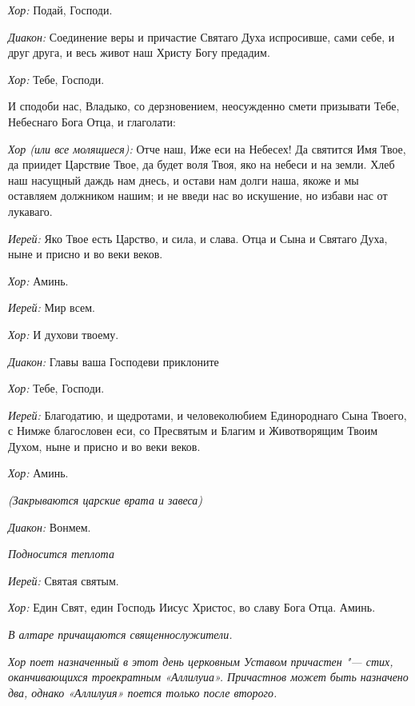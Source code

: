 \begin{mymulticols}
{\itshape Хор:} Подай, Господи.

{\itshape Диакон:} Соединение веры и причастие Святаго Духа испросивше, сами себе, и друг друга, и весь живот наш Христу Богу предадим. 

{\itshape Хор:} Тебе, Господи. 

И сподоби нас, Владыко, со дерзновением, неосужденно смети призывати Тебе, Небеснаго Бога Отца, и глаголати: 


{\itshape Хор (или все молящиеся):} Отче наш, Иже еси на Небесех! Да святится Имя Твое, да приидет Царствие Твое, да будет воля Твоя, яко на небеси и на земли. Хлеб наш насущный даждь нам днесь, и остави нам долги наша, якоже и мы оставляем должником нашим; и не введи нас во искушение, но избави нас от лукаваго. 

{\itshape Иерей:} Яко Твое есть Царство, и сила, и слава. Отца и Сына и Святаго Духа, ныне и присно и во веки веков. 

{\itshape Хор:} Аминь. 

{\itshape Иерей:} Мир всем. 

{\itshape Хор:} И духови твоему.

{\itshape Диакон:} Главы ваша Господеви приклоните

{\itshape Хор:} Тебе, Господи.

{\itshape Иерей:} Благодатию, и щедротами, и человеколюбием Единороднаго Сына Твоего, с Нимже благословен еси, со Пресвятым и Благим и Животворящим Твоим Духом, ныне и присно и во веки веков. 

{\itshape Хор:} Аминь.

{\itshape (Закрываются царские врата и завеса)}

{\itshape Диакон:} Вонмем. 

{\itshape Подносится теплота}

{\itshape Иерей:} Святая святым. 

{\itshape Хор:} Един Свят, един Господь Иисус Христос, во славу Бога Отца. Аминь. 


{\itshape В алтаре причащаются священнослужители. }

{\itshape Хор поет назначенный в этот день церковным Уставом причастен "--- стих, оканчивающихся троекратным «Аллилуиа». Причастнов может быть назначено два, однако «Аллилуия» поется только после второго.}



\end{mymulticols}

